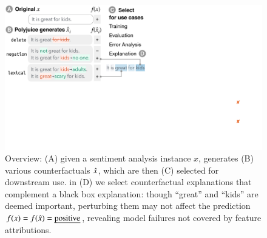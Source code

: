 
\begin{figure}[t]
\centering
\includegraphics[trim={0 18cm 30.5cm 0cm},clip, width=1\columnwidth]{figures/teaser.pdf}
\vspace{-5pt}
\caption{
Overview: (A) given a sentiment analysis instance $x$, \sysname generates (B) various counterfactuals $\hat{x}$, which are then (C) selected for downstream use.
\eg in (D) we select counterfactual explanations that complement a black box explanation: though ``great'' and ``kids'' are deemed important, perturbing them may not affect the prediction $f(x)=f(\hat{x})=\text{\emph{positive}}$, revealing model failures not covered by feature attributions.\footnotemark
}
\vspace{-5pt}
\label{fig:teaser}
\end{figure} 


